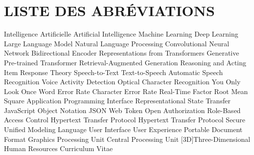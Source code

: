 \chapter*{LISTE DES ABRÉVIATIONS}
\adjustmtc%
\thispagestyle{MyStyle}

\begin{acronym}[WebRTC]
      {Intelligence Artificielle}
      {Artificial Intelligence}
      {Machine Learning}
      {Deep Learning}
     {Large Language Model}
     {Natural Language Processing}
     {Convolutional Neural Network}
    {Bidirectional Encoder Representations from Transformers}
     {Generative Pre-trained Transformer}
     {Retrieval-Augmented Generation}
   {Reasoning and Acting}
     {Item Response Theory}
     {Speech-to-Text}
     {Text-to-Speech}
     {Automatic Speech Recognition}
     {Voice Activity Detection}
     {Optical Character Recognition}
    {You Only Look Once}
     {Word Error Rate}
     {Character Error Rate}
     {Real-Time Factor}
     {Root Mean Square}
     {Application Programming Interface}
    {Representational State Transfer}
    {JavaScript Object Notation}
     {JSON Web Token}
   {Open Authorization}
    {Role-Based Access Control}
    {Hypertext Transfer Protocol}
   {Hypertext Transfer Protocol Secure}
     {Unified Modeling Language}
      {User Interface}
      {User Experience}
     {Portable Document Format}
     {Graphics Processing Unit}
     {Central Processing Unit}
  [3D]{Three-Dimensional}
      {Human Resources}
      {Curriculum Vitae}
\end{acronym}
